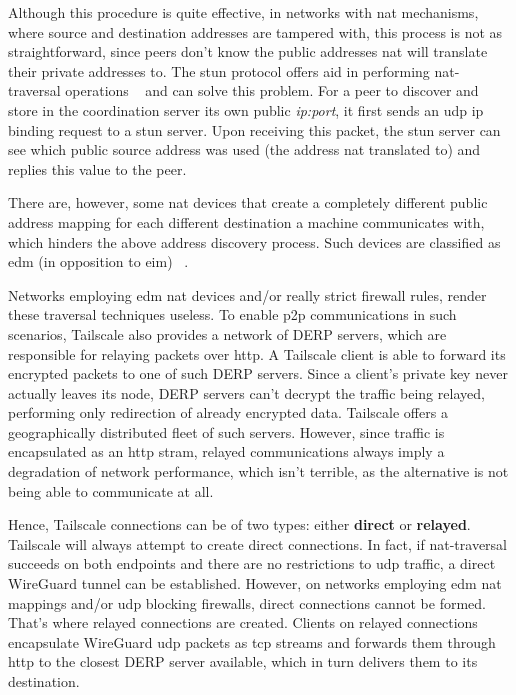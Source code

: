 \documentclass[11pt,twoside,a4paper]{report}
\begin{document}
Although this procedure is quite effective, in networks with \ac{nat} mechanisms, where source and destination addresses are tampered with, this process is not as straightforward, since peers don't know the public addresses \ac{nat} will translate their private addresses to. The \ac{stun} protocol offers aid in performing \ac{nat}-traversal operations ~\cite{rfc8489} and can solve this problem. For a peer to discover and store in the coordination server its own public \emph{ip:port}, it first sends an \ac{udp} \ac{ip} binding request to a \ac{stun} server. Upon receiving this packet, the \ac{stun} server can see which public source address was used (the address \ac{nat} translated to) and replies this value to the peer.

There are, however, some \ac{nat} devices that create a completely different public address mapping for each different destination a machine communicates with, which hinders the above address discovery process. Such devices are classified as \ac{edm} (in opposition to \ac{eim}) ~\cite{rfc4787}.

Networks employing \ac{edm} \ac{nat} devices and/or really strict firewall rules, render these traversal techniques useless. To enable \ac{p2p} communications in such scenarios, Tailscale also provides a network of \ac{DERP} servers, which are responsible for relaying packets over \ac{http}. A Tailscale client is able to forward its encrypted packets to one of such \ac{DERP} servers. Since a client's private key never actually leaves its node, \ac{DERP} servers can't decrypt the traffic being relayed, performing only redirection of already encrypted data. Tailscale offers a geographically distributed fleet of such servers. However, since traffic is encapsulated as an \ac{http} stram, relayed communications always imply a degradation of network performance, which isn't terrible, as the alternative is not being able to communicate at all.

Hence, Tailscale connections can be of two types: either \textbf{direct} or \textbf{relayed}. Tailscale will always attempt to create direct connections. In fact, if \ac{nat}-traversal succeeds on both endpoints and there are no restrictions to \ac{udp} traffic, a direct WireGuard tunnel can be established. However, on networks employing \ac{edm} \ac{nat} mappings and/or \ac{udp} blocking firewalls, direct connections cannot be formed. That's where relayed connections are created. Clients on relayed connections encapsulate WireGuard \ac{udp} packets as \ac{tcp} streams and forwards them through \ac{http} to the closest \ac{DERP} server available, which in turn delivers them to its destination.
\end{document}
